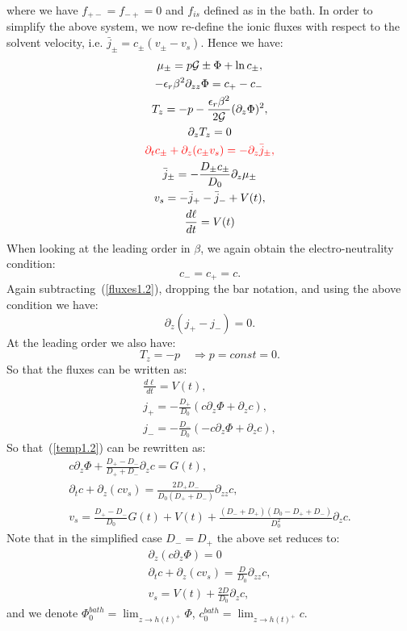 \documentclass[12pt]{extarticle}
\begin{document}
where we have $f_{+-}=f_{-+}=0$ and $f_{is}$ defined as in the bath.
In order to simplify the above system, we now re-define the ionic fluxes with respect to the solvent velocity, i.e. $\bar{j}_\pm=c_\pm\left(v_\pm-v_s\right)$. Hence we have:
\begin{gather}
\mu_\pm = p \mathcal{G} \pm \Phi + \ln c_\pm ,\\
-\epsilon_r\beta^2\partial_{zz} \Phi = c_+-c_-\, \\
T_z= -p-\frac{\epsilon_r\beta^2 }{2\mathcal{G}} (\partial_z \Phi)^2,\\
\partial_z T_z=0\\
\color{red}
\partial_t c_\pm +\partial_z(c_\pm v_s)= -\partial_z \bar{j}_\pm,\\
\bar{j}_\pm= - \frac{D_\pm c_\pm}{D_0}\partial_z \mu_\pm\\
v_s =-\bar{j}_+-\bar{j}_-+V(t),\\
\frac{d\ell}{dt}=V(t)
\end{gather}
When looking at the leading order in $\beta$, we again obtain the electro-neutrality condition:
\begin{equation}
c_-=c_+=c.
\end{equation}
Again subtracting~(\ref{fluxes1.2}), dropping the bar notation, and using the above condition we have:
\begin{equation}
\partial_z(j_+-j_-)=0.\label{temp1.2}
\end{equation}
At the leading order we also have:
\begin{equation}
T_z =-p \quad \Rightarrow p=const=0.
\end{equation}
So that the fluxes can be written as:
\begin{gather}
\frac{d\ell}{dt}=V(t),\\
j_+= - \frac{D_+}{D_0}\left(c\partial_z\Phi + \partial_z c\right),\\
j_-= - \frac{D_-}{D_0}\left(-c\partial_z\Phi + \partial_z c\right),
\end{gather}
So that~(\ref{temp1.2}) can be rewritten as:
\begin{gather}
c\partial_z\Phi+\frac{D_+-D_-}{D_++D_-}\partial_zc=G(t),\\
\partial_t c + \partial_z\left(cv_s\right)=\frac{2D_+D_-}{D_0(D_++D_-)}\partial_{zz}c,\\
v_s=\frac{D_+-D_-}{D_0}G(t)+V(t)+\frac{(D_-+D_+)(D_0-D_++D_-)}{D^2_0}\partial_z c.
\end{gather}
Note that in the simplified case $D_-=D_+$ the above set reduces to:
\begin{gather}
\partial_z\left(c\partial_z\Phi\right)=0\\
\partial_t c +\partial_z(cv_s)= \frac{D}{D_0} \partial_{zz} c,\\
v_s = V(t)+ \frac{2D}{D_0}\partial_z c,
\end{gather}
and we denote $\Phi^{bath}_0=\lim_{z\rightarrow h(t)^+} \Phi$, $c^{bath}_0=\lim_{z\rightarrow h(t)^+} c$.
\end{document}

